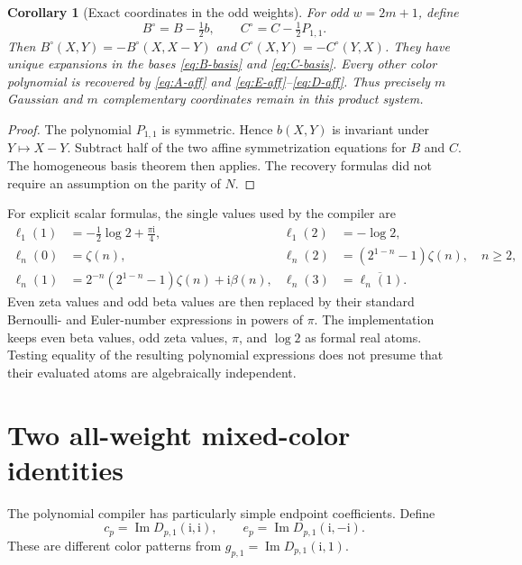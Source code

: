 \documentclass[11pt,a4paper]{article}
\numberwithin{equation}{section}
\newtheorem{corollary}[theorem]{Corollary}
\theoremstyle{definition}\newtheorem{definition}[theorem]{Definition}
\theoremstyle{remark}\newtheorem{remark}[theorem]{Remark}
\newcommand{\ii}{\mathrm i}
\newcommand{\Imag}{\operatorname{Im}}
\newcommand{\Ltwo}{\log 2}
\begin{document}
\begin{corollary}[Exact coordinates in the odd weights]\label{cor:odd-affine}
For odd $w=2m+1$, define
\[
B^\circ=B-\tfrac12 b,\qquad C^\circ=C-\tfrac12 P_{1,1}.
\]
Then $B^\circ(X,Y)=-B^\circ(X,X-Y)$ and
$C^\circ(X,Y)=-C^\circ(Y,X)$. They have unique expansions in the bases
\eqref{eq:B-basis} and \eqref{eq:C-basis}. Every other color polynomial is
recovered by \eqref{eq:A-aff} and \eqref{eq:E-aff}--\eqref{eq:D-aff}.
Thus precisely $m$ Gaussian and $m$ complementary coordinates remain in
this product system.
\end{corollary}
\begin{proof}
The polynomial $P_{1,1}$ is symmetric. Hence $b(X,Y)$ is invariant under
$Y\mapsto X-Y$. Subtract half of the two affine symmetrization equations
for $B$ and $C$. The homogeneous basis theorem then applies. The recovery
formulas did not require an assumption on the parity of $N$.
\end{proof}

For explicit scalar formulas, the single values used by the compiler are
\begin{align*}
\ell_1(1)&=-\tfrac12\Ltwo+\tfrac{\pi\ii}4,&\ell_1(2)&=-\Ltwo,\\
\ell_n(0)&=\zeta(n),&\ell_n(2)&=(2^{1-n}-1)\zeta(n),\quad n\ge2,\\
\ell_n(1)&=2^{-n}(2^{1-n}-1)\zeta(n)+\ii\beta(n),&
\ell_n(3)&=\overline{\ell_n(1)}.
\end{align*}
Even zeta values and odd beta values are then replaced by their standard
Bernoulli- and Euler-number expressions in powers of $\pi$. The implementation
keeps even beta values, odd zeta values, $\pi$, and $\log2$ as formal real
atoms. Testing equality of the resulting polynomial expressions does not
presume that their evaluated atoms are algebraically independent.

\section{Two all-weight mixed-color identities}
\label{sec:families}
The polynomial compiler has particularly simple endpoint coefficients.
Define
\[
c_p=\Imag D_{p,1}(\ii,\ii),\qquad
e_p=\Imag D_{p,1}(\ii,-\ii).
\]
These are different color patterns from $g_{p,1}=\Imag D_{p,1}(\ii,1)$.
\end{document}
